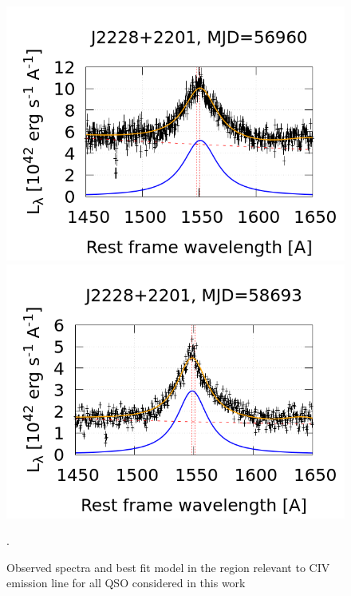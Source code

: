 \documentclass{article}
\begin{document}
\begin{figure}
  \includegraphics[width=.3\textwidth]{spec-7582-56960-0790}
  \includegraphics[width=.3\textwidth]{J2228p2201_58693}
  \caption{Observed spectra and best fit model in the region relevant to CIV emission line for all QSO considered in this work}.
  \label{fig:QSFit-CIV}
\end{figure}
\end{document}
